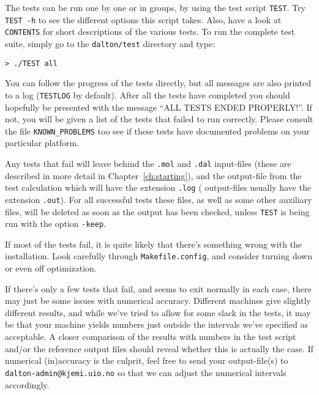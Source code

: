 The tests can be run one by one or in groups, by using the test script
\verb|TEST|. Try \verb|TEST -h| to see the different options this
script takes. Also, have a look at \verb|CONTENTS|
for short descriptions of the various tests. To run the
complete test suite, simply go to the \verb|dalton/test| directory and
type:
\begin{verbatim}
> ./TEST all
\end{verbatim}
You can follow the progress of the tests directly, but all messages
are also printed to a log (\verb|TESTLOG| by default). After all the
tests have completed you should hopefully be presented with the
message ``ALL TESTS ENDED PROPERLY!''. If not, you will be given a
list of the tests that failed to run correctly. Please consult the file
\verb|KNOWN_PROBLEMS| too see if these tests have documented problems
on your particular platform.

Any tests that fail will leave behind the \verb|.mol| and \verb|.dal|
input-files (these are described in more detail in
Chapter~\ref{ch:starting}), and the output-file from the test
calculation which will have the extension \verb|.log| ({\dalton}
output-files usually have the extension \verb|.out|). For all
successful tests these files, as well as some other auxiliary files,
will be deleted as soon as the output has been checked, unless
\verb|TEST| is being run with the option \verb|-keep|.

If most of the tests fail, it is quite likely that there's something
wrong with the installation. Look carefully through
\verb|Makefile.config|, and consider turning down or even off
optimization.

If there's only a few tests that fail, and {\dalton} seems to exit
normally in each case, there may just be some issues with numerical
accuracy. Different machines give slightly different results, and
while we've tried to allow for some slack in the tests, it may be
that your machine yields numbers just outside the intervals we've
specified as acceptable. A closer comparison of the results with
numbers in the test script and/or the reference output files should
reveal whether this is actually the case. If numerical (in)accuracy is
the culprit, feel free to send your output-file(s) to
\verb|dalton-admin@kjemi.uio.no| so that we can adjust the numerical
intervals accordingly.
